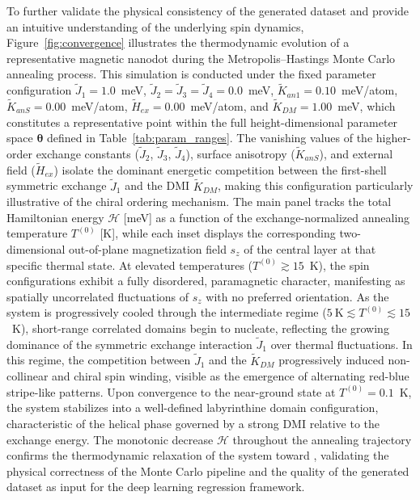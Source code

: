 \documentclass[final,5p,times,twocolumn]{elsarticle}
\begin{document}
To further validate the physical consistency of the generated dataset and provide an intuitive understanding of the underlying spin dynamics, Figure~\ref{fig:convergence} illustrates the thermodynamic evolution of a representative magnetic nanodot during the Metropolis--Hastings Monte Carlo annealing process. This simulation is conducted under the fixed parameter configuration $\tilde{J}_1 = 1.0$~meV, $\tilde{J}_2 = \tilde{J}_3 = \tilde{J}_4 = 0.0$~meV, $\tilde{K}_{an1} = 0.10$~meV/atom, $\tilde{K}_{anS} = 0.00$~meV/atom, $\tilde{H}_{ex} = 0.00$~meV/atom, and $\tilde{K}_{DM} = 1.00$~meV, which constitutes a representative point within the full height-dimensional parameter space $\boldsymbol{\theta}$ defined in Table~\ref{tab:param_ranges}. The vanishing values of the higher-order exchange constants ($\tilde{J}_2$, $\tilde{J}_3$, $\tilde{J}_4$), surface anisotropy ($\tilde{K}_{anS}$), and external field ($\tilde{H}_{ex}$) isolate the dominant energetic competition between the first-shell symmetric exchange $\tilde{J}_1$ and the DMI $\tilde{K}_{DM}$, making this configuration particularly illustrative of the chiral ordering mechanism. The main panel tracks the total Hamiltonian energy $\mathcal{H}$ [meV] as a function of the exchange-normalized annealing temperature $T^{(0)}$ [K], while each inset displays the corresponding two-dimensional out-of-plane magnetization field $s_z$ of the central layer at that specific thermal state. At elevated temperatures ($T^{(0)} \gtrsim 15$~K), the spin configurations exhibit a fully disordered, paramagnetic character, manifesting as spatially uncorrelated fluctuations of $s_z$ with no preferred orientation. As the system is progressively cooled through the intermediate regime ($5~\text{K} \lesssim T^{(0)} \lesssim 15$~K), short-range correlated domains begin to nucleate, reflecting the growing dominance of the symmetric exchange interaction $\tilde{J}_1$ over thermal fluctuations. In this regime, the competition between $\tilde{J}_1$ and the $\tilde{K}_{DM}$ progressively induced non-collinear and chiral spin winding, visible as the emergence of alternating red-blue stripe-like patterns. Upon convergence to the near-ground state at $T^{(0)} = 0.1$~K, the system stabilizes into a well-defined labyrinthine domain configuration, characteristic of the helical phase governed by a strong DMI relative to the exchange energy. The monotonic decrease $\mathcal{H}$ throughout the annealing trajectory confirms the thermodynamic relaxation of the system toward , validating the physical correctness of the Monte Carlo pipeline and the quality of the generated dataset as input for the deep learning regression framework.
\end{document}
